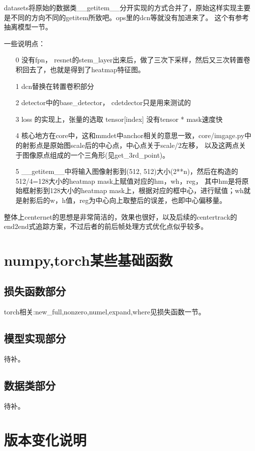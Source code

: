 \documentclass[UTF8]{ctexart}
\begin{document}
datasets将原始的数据类\_\_getitem\_\_分开实现的方式合并了，原始这样实现主要是不同的方向不同的getitem所致吧。ops里的dcn等就没有加进来了。
这个有参考抽离模型一节。

一些说明点：
\begin{itemize}
	\item[0] 没有fpn， resnet的stem\_layer出来后，做了三次下采样，然后又三次转置卷积回去了，也就是得到了heatmap特征图。
	\item[1] dcn替换在转置卷积部分
	\item[2] detector中的base\_detector， cdetdector只是用来测试的
	\item[3] loss 的实现上，张量的选取 tensor[index] 没有tensor * mask速度快
	\item[4] 核心地方在core中，这和mmdet中anchor相关的意思一致，core/imgage.py中的射影点是原始图scale后的中心点，中心点关于scale/2左移，
	以及这两点关于图像原点组成的一个三角形(见get\_3rd\_point)。
	\item[5] \_\_getitem\_\_中将输入图像射影到(512, 512)大小(2**n)，然后在构造的512/4=128大小的heatmap mask上赋值对应的hm，wh，reg，
	其中hm是将原始框射影到128大小的heatmap mask上，根据对应的框中心，进行赋值；wh就是射影后的w，h值，reg为中心向上取整后的误差，也即中心偏移量。
\end{itemize}

整体上centernet的思想是非常简洁的，效果也很好，以及后续的centertrack的end2end式追踪方案，不过后者的前后帧处理方式优化点似乎较多。
\section{numpy,torch某些基础函数}
\label{sec:basefunc}
\subsection{损失函数部分}
torch相关:new\_full,nonzero,numel,expand,where见损失函数一节。
\subsection{模型实现部分}
待补。
\subsection{数据类部分}
待补。

\section{版本变化说明}
\end{document}
